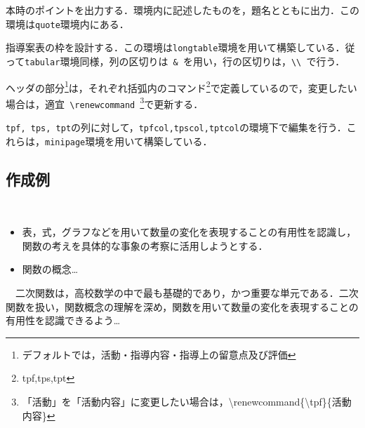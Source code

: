 \documentclass[paper=a4,fontsize=10.5pt]{jlreq}
\begin{document}
\par
本時のポイントを出力する．環境内に記述したものを，題名とともに出力．この環境は\verb|quote|環境内にある．\\
\noindent{}\par
指導案表の枠を設計する．この環境は\verb|longtable|環境を用いて構築している．従って\verb|tabular|環境同様，列の区切りは\verb| & |を用い，行の区切りは，\verb|\\ |で行う．\par
ヘッダの部分\footnote{デフォルトでは，活動・指導内容・指導上の留意点及び評価}は，それぞれ括弧内のコマンド\footnote{tpf,tps,tpt}で定義しているので，変更したい場合は，適宜\verb| \renewcommand |\footnote{「活動」を「活動内容」に変更したい場合は，{\ttfamily\textbackslash renewcommand\{\textbackslash tpf\}\{活動内容\}}}で更新する．\vspace{0.5em}\\
\par
\verb|tpf, tps, tpt|の列に対して，\verb|tpfcol,tpscol,tptcol|の環境下で編集を行う．これらは，\verb|minipage|環境を用いて構築している．\par
\newpage
\begin{leftbar}
    \section*{作成例}
\end{leftbar}
\\
\hrulefill\vspace{1em}
\begin{UnitGoals}
    \begin{itemize}
        \item 表，式，グラフなどを用いて数量の変化を表現することの有用性を認識し，関数の考えを具体的な事象の考察に活用しようとする．
        \item 関数の概念\dots
    \end{itemize}
\end{UnitGoals}
\begin{UnitView}
    \ \ 二次関数は，高校数学の中で最も基礎的であり，かつ重要な単元である．二次関数を扱い，関数概念の理解を深め，関数を用いて数量の変化を表現することの有用性を認識できるよう\dots
\end{UnitView}
\end{document}
